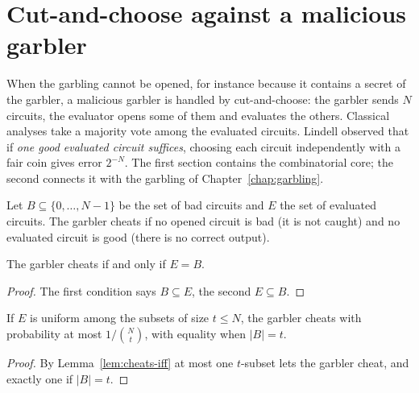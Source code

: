 \chapter{Cut-and-choose against a malicious garbler}
\label{chap:cut-and-choose}

When the garbling cannot be opened, for instance because it contains a secret of the garbler, a
malicious garbler is handled by cut-and-choose: the garbler sends $N$
circuits, the evaluator opens some of them and evaluates the others. Classical analyses take a
majority vote among the evaluated circuits. Lindell \cite{Lin13} observed that if \emph{one good
evaluated circuit suffices}, choosing each circuit independently with a fair coin gives error
$2^{-N}$. The first section contains
the combinatorial core; the second connects it with the garbling of Chapter~\ref{chap:garbling}.

\begin{definition}[Cheating]
  \label{def:cheats}
  \leanok
  Let $B \subseteq \{0, \dots, N - 1\}$ be the set of bad circuits and $E$ the set of evaluated
  circuits. The garbler cheats if no opened circuit is bad (it is not caught) and no evaluated
  circuit is good (there is no correct output).
\end{definition}

\begin{lemma}
  \label{lem:cheats-iff}
  \leanok
  The garbler cheats if and only if $E = B$.
\end{lemma}

\begin{proof}
  \leanok
  The first condition says $B \subseteq E$, the second $E \subseteq B$.
\end{proof}

\begin{theorem}
  \label{thm:cc-fixed}
  \leanok
  If $E$ is uniform among the subsets of size $t \le N$, the garbler cheats with probability at
  most $1/\binom{N}{t}$, with equality when $|B| = t$.
\end{theorem}

\begin{proof}
  \leanok
  By Lemma~\ref{lem:cheats-iff} at most one $t$-subset lets the garbler cheat, and exactly one if
  $|B| = t$.
\end{proof}

